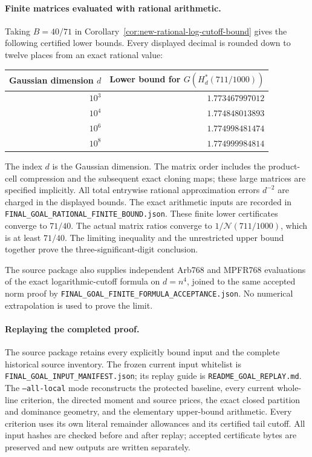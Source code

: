 \documentclass[11pt]{article}
\newcommand{\N}{\mathcal N}
\begin{document}
\paragraph{Finite matrices evaluated with rational arithmetic.}
Taking $B=40/71$ in Corollary~\ref{cor:new-rational-log-cutoff-bound}
gives the following certified lower bounds. Every displayed decimal is
rounded down to twelve places from an exact rational value:
\begin{center}
\begin{tabular}{rr}
Gaussian dimension $d$ & Lower bound for $G(H_d^*(711/1000))$\\\hline
$10^3$ & $1.773467997012$ \\
$10^4$ & $1.774848013893$ \\
$10^6$ & $1.774998481474$ \\
$10^8$ & $1.774999984814$ \\
\hline
\end{tabular}
\end{center}
The index $d$ is the Gaussian dimension. The matrix order includes the
product-cell compression and the subsequent exact cloning maps; these
large matrices are specified implicitly. All total entrywise rational
approximation errors $d^{-2}$ are charged in the displayed bounds.
The exact arithmetic inputs are recorded in
\texttt{FINAL\_GOAL\_RATIONAL\_FINITE\_BOUND.json}.
These finite lower certificates converge to $71/40$. The actual matrix
ratios converge to $1/\N(711/1000)$, which is at least $71/40$.
The limiting inequality and the unrestricted upper bound together prove
the three-significant-digit conclusion.

The source package also supplies independent Arb768 and MPFR768
evaluations of the exact logarithmic-cutoff formula on $d=n^4$, joined to
the same accepted norm proof by
\texttt{FINAL\_GOAL\_FINITE\_FORMULA\_ACCEPTANCE.json}.
No numerical extrapolation is used to prove the limit.

\paragraph{Replaying the completed proof.}
The source package retains every explicitly bound input and the complete
historical source inventory. The frozen current input whitelist is
\texttt{FINAL\_GOAL\_INPUT\_MANIFEST.json}; its replay guide is
\texttt{README\_GOAL\_REPLAY.md}. The \texttt{--all-local} mode reconstructs
the protected baseline, every current whole-line criterion, the directed
moment and source prices, the exact closed partition and dominance
geometry, and the elementary upper-bound arithmetic. Every criterion
uses its own literal remainder allowances and its certified tail cutoff.
All input hashes are checked before and after replay; accepted certificate
bytes are preserved and new outputs are written separately.
\end{document}
